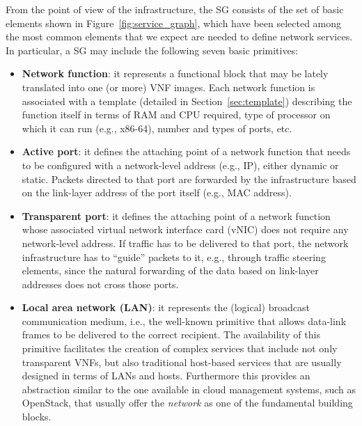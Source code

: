 From the point of view of the infrastructure, the SG consists of the set of basic elements shown in Figure~\ref{fig:service_graph}, which have been selected among the most common elements that we expect are needed to define network services.
In particular, a SG may include the following seven basic primitives:
\begin{itemize}
	\item \textbf{Network function}: it represents a functional block that may be lately translated into one (or more) VNF images. %
	Each network function is associated with a template (detailed in Section~\ref{sec:template}) describing the function itself in terms of RAM and CPU required, type of processor on which it can run (e.g., x86-64), number and types of ports, etc.
	\item \textbf{Active port}: it defines the attaching point of a network function that needs to be configured with a network-level address (e.g., IP), either dynamic or static. Packets directed to that port are forwarded by the infrastructure based on the link-layer address of the port itself (e.g., MAC address).
	\item \textbf{Transparent port}: it defines the attaching point of a network function whose associated virtual network interface card (vNIC) does not require any network-level address. If traffic has to be delivered to that port, the network infrastructure has to ``guide'' packets to it, e.g., through traffic steering elements, since the natural forwarding of the data based on link-layer addresses does not cross those ports.
	\item \textbf{Local area network (LAN)}: it represents the (logical) broadcast communication medium, i.e., the well-known primitive that allows data-link frames to be delivered to the correct recipient. The availability of this primitive facilitates the creation of complex services that include not only transparent VNFs, but also traditional host-based services that are usually designed in terms of LANs and hosts. Furthermore this provides an abstraction similar to the one available in cloud management systems, such as OpenStack, that usually offer the \textit{network} as one of the fundamental building blocks.

\end{itemize}
